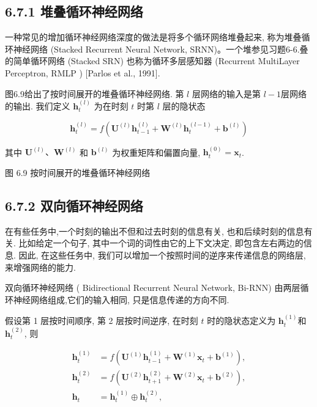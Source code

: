 \documentclass[10pt]{article}
\begin{document}
\subsection*{6.7.1 堆叠循环神经网络}
一种常见的增加循环神经网络深度的做法是将多个循环网络堆叠起来, 称为堆叠循环神经网络 (Stacked Recurrent Neural Network, SRNN)。一个堆参见习题6-6.叠的简单循环网络 (Stacked SRN) 也称为循环多层感知器 (Recurrent MultiLayer Perceptron, RMLP ) [Parlos et al., 1991].

图6.9给出了按时间展开的堆叠循环神经网络. 第 $l$ 层网络的输入是第 $l-1$层网络的输出. 我们定义 $\boldsymbol{h}_{t}^{(l)}$ 为在时刻 $t$ 时第 $l$ 层的隐状态


\begin{equation*}
\boldsymbol{h}_{t}^{(l)}=f\left(\boldsymbol{U}^{(l)} \boldsymbol{h}_{t-1}^{(l)}+\boldsymbol{W}^{(l)} \boldsymbol{h}_{t}^{(l-1)}+\boldsymbol{b}^{(l)}\right) \tag{6.70}
\end{equation*}


其中 $\boldsymbol{U}^{(l)} 、 \boldsymbol{W}^{(l)}$ 和 $\boldsymbol{b}^{(l)}$ 为权重矩阵和偏置向量, $\boldsymbol{h}_{t}^{(0)}=\boldsymbol{x}_{t}$.



图 6.9 按时间展开的堆叠循环神经网络

\subsection*{6.7.2 双向循环神经网络}
在有些任务中,一个时刻的输出不但和过去时刻的信息有关, 也和后续时刻的信息有关. 比如给定一个句子, 其中一个词的词性由它的上下文决定, 即包含左右两边的信息. 因此, 在这些任务中, 我们可以增加一个按照时间的逆序来传递信息的网络层, 来增强网络的能力.

双向循环神经网络 ( Bidirectional Recurrent Neural Network, Bi-RNN) 由两层循环神经网络组成,它们的输入相同, 只是信息传递的方向不同.

假设第 1 层按时间顺序, 第 2 层按时间逆序, 在时刻 $t$ 时的隐状态定义为 $\boldsymbol{h}_{t}^{(1)}$和 $\boldsymbol{h}_{t}^{(2)}$, 则


\begin{align*}
\boldsymbol{h}_{t}^{(1)} & =f\left(\boldsymbol{U}^{(1)} \boldsymbol{h}_{t-1}^{(1)}+\boldsymbol{W}^{(1)} \boldsymbol{x}_{t}+\boldsymbol{b}^{(1)}\right),  \tag{6.71}\\
\boldsymbol{h}_{t}^{(2)} & =f\left(\boldsymbol{U}^{(2)} \boldsymbol{h}_{t+1}^{(2)}+\boldsymbol{W}^{(2)} \boldsymbol{x}_{t}+\boldsymbol{b}^{(2)}\right),  \tag{6.72}\\
\boldsymbol{h}_{t} & =\boldsymbol{h}_{t}^{(1)} \oplus \boldsymbol{h}_{t}^{(2)}, \tag{6.73}
\end{align*}
\end{document}
